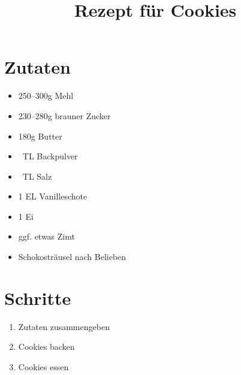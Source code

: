 \documentclass{article}
\title{Rezept für Cookies}
\date{}
\begin{document}
\maketitle

\section*{Zutaten}

\begin{itemize}[left=0pt]
  \item 250--300g Mehl
  \item 230--280g brauner Zucker
  \item 180g Butter
  \item \textonehalf~TL Backpulver
  \item \textonehalf~TL Salz
  \item 1 EL Vanilleschote
  \item 1 Ei
  \item ggf. etwas Zimt
  \item Schokosträusel nach Belieben
\end{itemize}

\section*{Schritte}

\begin{enumerate}[left=0pt]
  \item Zutaten zusammengeben
  \item Cookies backen
  \item Cookies essen
\end{enumerate}
\end{document}
